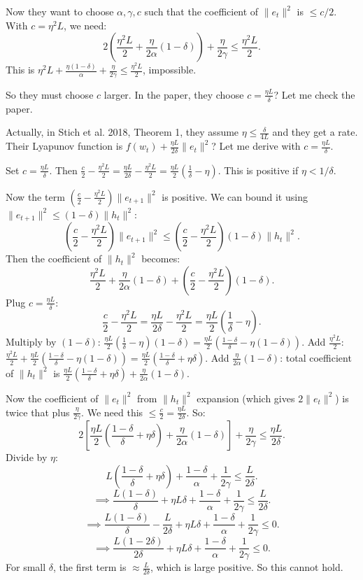 \documentclass{article}
\begin{document}
Now they want to choose $\alpha, \gamma, c$ such that the coefficient of $\|e_t\|^2$ is $\le c/2$.
With $c = \eta^2 L$, we need:
\[
2\left( \frac{\eta^2 L}{2} + \frac{\eta}{2\alpha}(1-\delta) \right) + \frac{\eta}{2\gamma} \le \frac{\eta^2 L}{2}.
\]
This is $\eta^2 L + \frac{\eta(1-\delta)}{\alpha} + \frac{\eta}{2\gamma} \le \frac{\eta^2 L}{2}$, impossible.

So they must choose $c$ larger. In the paper, they choose $c = \frac{\eta L}{\delta}$? Let me check the paper.

Actually, in Stich et al. 2018, Theorem 1, they assume $\eta \le \frac{\delta}{4L}$ and they get a rate. Their Lyapunov function is $f(w_t) + \frac{\eta L}{2\delta} \|e_t\|^2$? Let me derive with $c = \frac{\eta L}{\delta}$.

Set $c = \frac{\eta L}{\delta}$.
Then $\frac{c}{2} - \frac{\eta^2 L}{2} = \frac{\eta L}{2\delta} - \frac{\eta^2 L}{2} = \frac{\eta L}{2}(\frac{1}{\delta} - \eta)$.
This is positive if $\eta < 1/\delta$.

Now the term $\left(\frac{c}{2} - \frac{\eta^2 L}{2}\right) \|e_{t+1}\|^2$ is positive. We can bound it using $\|e_{t+1}\|^2 \le (1-\delta)\|h_t\|^2$:
\[
\left(\frac{c}{2} - \frac{\eta^2 L}{2}\right) \|e_{t+1}\|^2 \le \left(\frac{c}{2} - \frac{\eta^2 L}{2}\right)(1-\delta) \|h_t\|^2.
\]
Then the coefficient of $\|h_t\|^2$ becomes:
\[
\frac{\eta^2 L}{2} + \frac{\eta}{2\alpha}(1-\delta) + \left(\frac{c}{2} - \frac{\eta^2 L}{2}\right)(1-\delta).
\]
Plug $c = \frac{\eta L}{\delta}$:
\[
\frac{c}{2} - \frac{\eta^2 L}{2} = \frac{\eta L}{2\delta} - \frac{\eta^2 L}{2} = \frac{\eta L}{2}(\frac{1}{\delta} - \eta).
\]
Multiply by $(1-\delta)$: $\frac{\eta L}{2}(\frac{1}{\delta} - \eta)(1-\delta) = \frac{\eta L}{2}(\frac{1-\delta}{\delta} - \eta(1-\delta))$.
Add $\frac{\eta^2 L}{2}$: $\frac{\eta^2 L}{2} + \frac{\eta L}{2}(\frac{1-\delta}{\delta} - \eta(1-\delta)) = \frac{\eta L}{2}(\frac{1-\delta}{\delta} + \eta \delta)$.
Add $\frac{\eta}{2\alpha}(1-\delta)$: total coefficient of $\|h_t\|^2$ is $\frac{\eta L}{2}(\frac{1-\delta}{\delta} + \eta \delta) + \frac{\eta}{2\alpha}(1-\delta)$.

Now the coefficient of $\|e_t\|^2$ from $\|h_t\|^2$ expansion (which gives $2\|e_t\|^2$) is twice that plus $\frac{\eta}{2\gamma}$.
We need this $\le \frac{c}{2} = \frac{\eta L}{2\delta}$.
So:
\[
2\left[ \frac{\eta L}{2}(\frac{1-\delta}{\delta} + \eta \delta) + \frac{\eta}{2\alpha}(1-\delta) \right] + \frac{\eta}{2\gamma} \le \frac{\eta L}{2\delta}.
\]
Divide by $\eta$:
\[
L(\frac{1-\delta}{\delta} + \eta \delta) + \frac{1-\delta}{\alpha} + \frac{1}{2\gamma} \le \frac{L}{2\delta}.
\]
\[
\implies \frac{L(1-\delta)}{\delta} + \eta L \delta + \frac{1-\delta}{\alpha} + \frac{1}{2\gamma} \le \frac{L}{2\delta}.
\]
\[
\implies \frac{L(1-\delta)}{\delta} - \frac{L}{2\delta} + \eta L \delta + \frac{1-\delta}{\alpha} + \frac{1}{2\gamma} \le 0.
\]
\[
\implies \frac{L(1-2\delta)}{2\delta} + \eta L \delta + \frac{1-\delta}{\alpha} + \frac{1}{2\gamma} \le 0.
\]
For small $\delta$, the first term is $\approx \frac{L}{2\delta}$, which is large positive. So this cannot hold.
\end{document}
